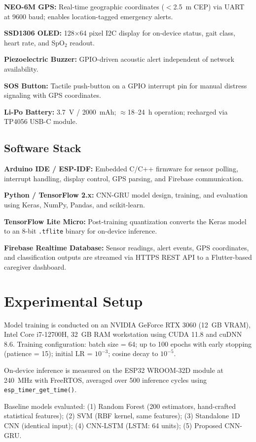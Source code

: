 \documentclass[conference]{IEEEtran}
\begin{document}
\textbf{NEO-6M GPS:} Real-time geographic coordinates ($<$2.5~m CEP) via UART at 9600 baud; enables location-tagged emergency alerts.

\textbf{SSD1306 OLED:} 128$\times$64 pixel I2C display for on-device status, gait class, heart rate, and SpO$_2$ readout.

\textbf{Piezoelectric Buzzer:} GPIO-driven acoustic alert independent of network availability.

\textbf{SOS Button:} Tactile push-button on a GPIO interrupt pin for manual distress signaling with GPS coordinates.

\textbf{Li-Po Battery:} 3.7~V / 2000~mAh; $\approx$18--24~h operation; recharged via TP4056 USB-C module.

\subsection{Software Stack}

\textbf{Arduino IDE / ESP-IDF:} Embedded C/C++ firmware for sensor polling, interrupt handling, display control, GPS parsing, and Firebase communication.

\textbf{Python / TensorFlow 2.x:} CNN-GRU model design, training, and evaluation using Keras, NumPy, Pandas, and scikit-learn.

\textbf{TensorFlow Lite Micro:} Post-training quantization converts the Keras model to an 8-bit \texttt{.tflite} binary for on-device inference.

\textbf{Firebase Realtime Database:} Sensor readings, alert events, GPS coordinates, and classification outputs are streamed via HTTPS REST API to a Flutter-based caregiver dashboard.

\section{Experimental Setup}

Model training is conducted on an NVIDIA GeForce RTX 3060 (12~GB VRAM), Intel Core i7-12700H, 32~GB RAM workstation using CUDA 11.8 and cuDNN 8.6. Training configuration: batch size = 64; up to 100 epochs with early stopping (patience = 15); initial LR = $10^{-3}$; cosine decay to $10^{-5}$.

On-device inference is measured on the ESP32 WROOM-32D module at 240~MHz with FreeRTOS, averaged over 500 inference cycles using \texttt{esp\_timer\_get\_time()}.

Baseline models evaluated: (1) Random Forest (200 estimators, hand-crafted statistical features); (2) SVM (RBF kernel, same features); (3) Standalone 1D CNN (identical input); (4) CNN-LSTM (LSTM: 64 units); (5) Proposed CNN-GRU.
\end{document}
